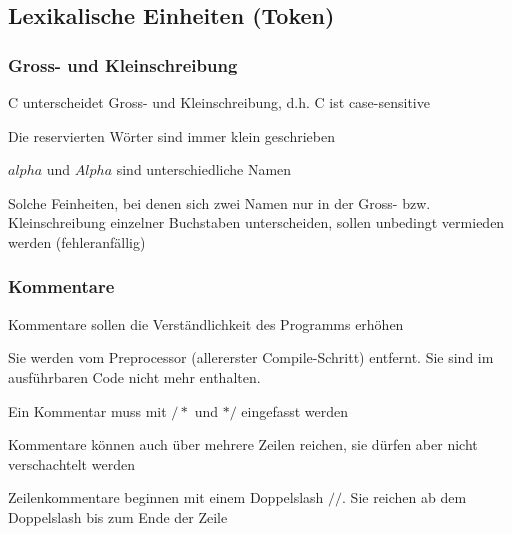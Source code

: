  	\subsection{Lexikalische Einheiten (Token)}
 		\subsubsection{Gross- und Kleinschreibung}
 			\begin{compactitem}
 				\item C unterscheidet Gross- und Kleinschreibung, d.h. C ist case-sensitive
 				\item Die reservierten Wörter sind immer klein geschrieben
 				\item $alpha$ und $Alpha$ sind unterschiedliche Namen
 				\item Solche Feinheiten, bei denen sich zwei Namen nur in der Gross- bzw. Kleinschreibung einzelner Buchstaben unterscheiden, sollen unbedingt vermieden werden (fehleranfällig)
 			\end{compactitem}
 		\subsubsection{Kommentare}
 			\begin{compactitem}
 				\item Kommentare sollen die Verständlichkeit des Programms erhöhen
 				\item Sie werden vom Preprocessor (allererster Compile-Schritt) entfernt. Sie sind im
 				ausführbaren Code nicht mehr enthalten.
 				\item Ein Kommentar muss mit
 				$/*$ und $*/$ eingefasst werden
 				\item Kommentare können auch über mehrere Zeilen reichen, sie dürfen aber nicht
 				verschachtelt werden
 				\item Zeilenkommentare beginnen mit einem Doppelslash
 				$//$. Sie reichen ab dem
 				Doppelslash bis zum Ende der Zeile
 			\end{compactitem}
